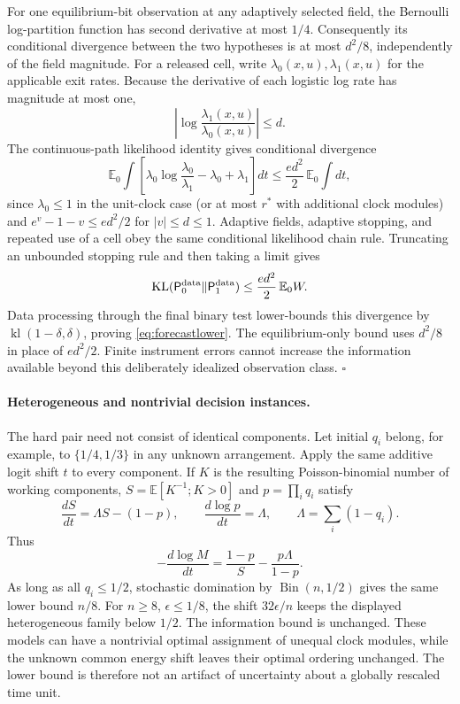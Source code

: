 For one equilibrium-bit observation at any adaptively selected field,
the Bernoulli log-partition function has second derivative at most $1/4$.
Consequently its conditional divergence between the two hypotheses is at
most $d^2/8$, independently of the field magnitude.  For a released cell,
write $\lambda_0(x,u),\lambda_1(x,u)$ for the applicable exit rates.
Because the derivative of each logistic log rate has magnitude at most one,
\[
 \left|\log\frac{\lambda_1(x,u)}{\lambda_0(x,u)}\right|\le d.
\]
The continuous-path likelihood identity gives conditional divergence
\[
 \mathbb E_0\int
 \left[\lambda_0\log\frac{\lambda_0}{\lambda_1}
             -\lambda_0+\lambda_1\right]dt
 \le\frac{ed^2}{2}\,\mathbb E_0\int dt,
\]
since $\lambda_0\le1$ in the unit-clock case (or at most $r^*$ with
additional clock modules) and
$e^v-1-v\le e d^2/2$ for $|v|\le d\le1$.
Adaptive fields, adaptive stopping, and repeated use of a cell obey the
same conditional likelihood chain rule.  Truncating an unbounded stopping
rule and then taking a limit gives
\[
 \operatorname{KL}(\mathsf P_0^{\rm data}\Vert\mathsf P_1^{\rm data})
 \le\frac{ed^2}{2}\,\mathbb E_0 W.
\]
Data processing through the final binary test lower-bounds this divergence
by $\operatorname{kl}(1-\delta,\delta)$, proving
\eqref{eq:forecastlower}.  The equilibrium-only bound uses $d^2/8$ in
place of $ed^2/2$.  Finite instrument errors cannot increase the information
available beyond this deliberately idealized observation class.
\hfill$\square$

\paragraph{Heterogeneous and nontrivial decision instances.}
The hard pair need not consist of identical components.  Let initial
$q_i$ belong, for example, to $\{1/4,1/3\}$ in any unknown arrangement.
Apply the same additive logit shift $t$ to every component.
If $K$ is the resulting Poisson-binomial number of working components,
$S=\mathbb E[K^{-1};K>0]$ and $p=\prod_iq_i$ satisfy
\[
 \frac{dS}{dt}=\Lambda S-(1-p),\qquad
 \frac{d\log p}{dt}=\Lambda,
 \qquad \Lambda=\sum_i(1-q_i).
\]
Thus
\[
 -\frac{d\log M}{dt}=\frac{1-p}{S}-\frac{p\Lambda}{1-p}.
\]
As long as all $q_i\le1/2$, stochastic domination by
$\operatorname{Bin}(n,1/2)$ gives the same lower bound $n/8$.
For $n\ge8$, $\epsilon\le1/8$, the shift $32\epsilon/n$ keeps the
displayed heterogeneous family below $1/2$.  The information bound is
unchanged.  These models can have a nontrivial optimal assignment of unequal
clock modules, while the unknown common energy shift leaves their optimal
ordering unchanged.  The lower bound is therefore not an artifact of
uncertainty about a globally rescaled time unit.

